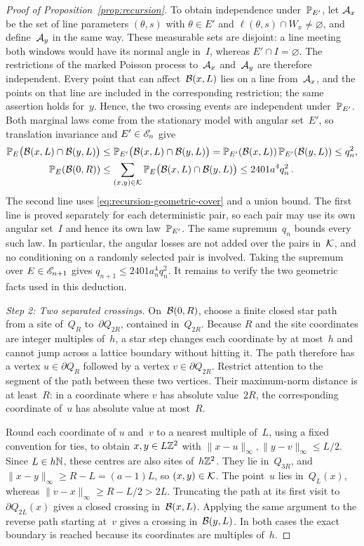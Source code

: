 \documentclass[11pt,letterpaper]{article}
\begin{document}
\begin{proof}[Proof of Proposition~\ref{prop:recursion}]
To obtain independence under~$\P_{E'}$, let $\cA_x$ be the set of line parameters $(\theta,s)$ with $\theta\in E'$ and $\ell(\theta,s)\cap W_x\neq\varnothing$, and define~$\cA_y$ in the same way. These measurable sets are disjoint: a line meeting both windows would have its normal angle in~$I$, whereas $E'\cap I=\varnothing$. The restrictions of the marked Poisson process to~$\cA_x$ and~$\cA_y$ are therefore independent. Every point that can affect~$\cB(x,L)$ lies on a line from~$\cA_x$, and the points on that line are included in the corresponding restriction; the same assertion holds for~$y$. Hence, the two crossing events are independent under~$\P_{E'}$. Both marginal laws come from the stationary model with angular set~$E'$, so translation invariance and $E'\in\cE_n$ give
\begin{align}\label{eq:recursion-probability-reduction}
  \P_E\bigl(\cB(x,L)\cap\cB(y,L)\bigr)&\le\P_{E'}\bigl(\cB(x,L)\cap\cB(y,L)\bigr)=\P_{E'}(\cB(x,L))\,\P_{E'}(\cB(y,L))\le q_n^2,\\
  \P_E(\cB(0,R))&\le\sum_{(x,y)\in\cK}\P_E\bigl(\cB(x,L)\cap\cB(y,L)\bigr)\le2401a^4q_n^2\,.\notag
\end{align}
The second line uses \eqref{eq:recursion-geometric-cover} and a union bound. The first line is proved separately for each deterministic pair, so each pair may use its own angular set~$I$ and hence its own law~$\P_{E'}$. The same supremum~$q_n$ bounds every such law. In particular, the angular losses are not added over the pairs in~$\cK$, and no conditioning on a randomly selected pair is involved. Taking the supremum over $E\in\cE_{n+1}$ gives $q_{n+1}\le2401a_n^4q_n^2$. It remains to verify the two geometric facts used in this deduction.

\emph{Step 2: Two separated crossings.} On~$\cB(0,R)$, choose a finite closed star path from a site of~$Q_R$ to~$\partial Q_{2R}$, contained in~$Q_{2R}$. Because $R$ and the site coordinates are integer multiples of~$h$, a star step changes each coordinate by at most~$h$ and cannot jump across a lattice boundary without hitting it. The path therefore has a vertex $u\in\partial Q_R$ followed by a vertex $v\in\partial Q_{2R}$. Restrict attention to the segment of the path between these two vertices. Their maximum-norm distance is at least~$R$: in a coordinate where $v$ has absolute value~$2R$, the corresponding coordinate of~$u$ has absolute value at most~$R$.

Round each coordinate of $u$ and~$v$ to a nearest multiple of~$L$, using a fixed convention for ties, to obtain $x,y\in L\Z^2$ with $\lVert x-u\rVert_\infty,\lVert y-v\rVert_\infty\le L/2$. Since $L\in h\N$, these centres are also sites of~$h\Z^2$. They lie in~$Q_{3R}$, and $\lVert x-y\rVert_\infty\ge R-L=(a-1)L$, so $(x,y)\in\cK$. The point~$u$ lies in~$Q_L(x)$, whereas $\lVert v-x\rVert_\infty\ge R-L/2>2L$. Truncating the path at its first visit to~$\partial Q_{2L}(x)$ gives a closed crossing in~$\cB(x,L)$. Applying the same argument to the reverse path starting at~$v$ gives a crossing in~$\cB(y,L)$. In both cases the exact boundary is reached because its coordinates are multiples of~$h$.


\end{proof}
\end{document}
